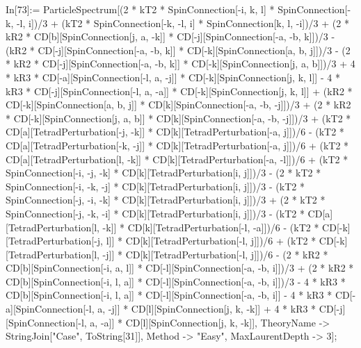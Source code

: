 In[73]:= ParticleSpectrum[(2 * kT2 * SpinConnection[-i, k, l] * SpinConnection[-k, -l, i])/3 + (kT2 * SpinConnection[-k, -l, i] * SpinConnection[k, l, -i])/3 + (2 * kR2 * CD[b][SpinConnection[j, a, -k]] * CD[-j][SpinConnection[-a, -b, k]])/3 - (kR2 * CD[-j][SpinConnection[-a, -b, k]] * CD[-k][SpinConnection[a, b, j]])/3 - (2 * kR2 * CD[-j][SpinConnection[-a, -b, k]] * CD[-k][SpinConnection[j, a, b]])/3 + 4 * kR3 * CD[-a][SpinConnection[-l, a, -j]] * CD[-k][SpinConnection[j, k, l]] - 4 * kR3 * CD[-j][SpinConnection[-l, a, -a]] * CD[-k][SpinConnection[j, k, l]] + (kR2 * CD[-k][SpinConnection[a, b, j]] * CD[k][SpinConnection[-a, -b, -j]])/3 + (2 * kR2 * CD[-k][SpinConnection[j, a, b]] * CD[k][SpinConnection[-a, -b, -j]])/3 + (kT2 * CD[a][TetradPerturbation[-j, -k]] * CD[k][TetradPerturbation[-a, j]])/6 - (kT2 * CD[a][TetradPerturbation[-k, -j]] * CD[k][TetradPerturbation[-a, j]])/6 + (kT2 * CD[a][TetradPerturbation[l, -k]] * CD[k][TetradPerturbation[-a, -l]])/6 + (kT2 * SpinConnection[-i, -j, -k] * CD[k][TetradPerturbation[i, j]])/3 - (2 * kT2 * SpinConnection[-i, -k, -j] * CD[k][TetradPerturbation[i, j]])/3 - (kT2 * SpinConnection[-j, -i, -k] * CD[k][TetradPerturbation[i, j]])/3 + (2 * kT2 * SpinConnection[-j, -k, -i] * CD[k][TetradPerturbation[i, j]])/3 - (kT2 * CD[a][TetradPerturbation[l, -k]] * CD[k][TetradPerturbation[-l, -a]])/6 - (kT2 * CD[-k][TetradPerturbation[-j, l]] * CD[k][TetradPerturbation[-l, j]])/6 + (kT2 * CD[-k][TetradPerturbation[l, -j]] * CD[k][TetradPerturbation[-l, j]])/6 - (2 * kR2 * CD[b][SpinConnection[-i, a, l]] * CD[-l][SpinConnection[-a, -b, i]])/3 + (2 * kR2 * CD[b][SpinConnection[-i, l, a]] * CD[-l][SpinConnection[-a, -b, i]])/3 - 4 * kR3 * CD[b][SpinConnection[-i, l, a]] * CD[-l][SpinConnection[-a, -b, i]] - 4 * kR3 * CD[-a][SpinConnection[-l, a, -j]] * CD[l][SpinConnection[j, k, -k]] + 4 * kR3 * CD[-j][SpinConnection[-l, a, -a]] * CD[l][SpinConnection[j, k, -k]], TheoryName -> StringJoin["Case", ToString[31]], Method -> "Easy", MaxLaurentDepth -> 3]; 